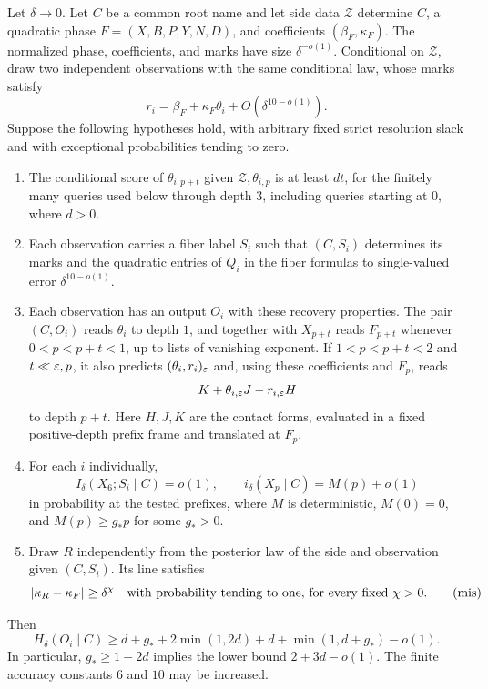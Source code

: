 \begin{lemma}\label{act:line-test}
Let $\delta\to0$.  Let $C$ be a common root name and let side data
$\mathscr Z$ determine $C$, a quadratic phase
$F=(X,B,P,Y,N,D)$, and coefficients $(\beta_F,\kappa_F)$.
The normalized phase, coefficients, and marks have size
$\delta^{-o(1)}$.  Conditional on $\mathscr Z$, draw two independent
observations with the same conditional law, whose marks satisfy
\begin{equation}
 r_i=\beta_F+\kappa_F\theta_i+O(\delta^{10-o(1)}).
 \tag{s-line}\label{eq:s-line}
\end{equation}
Suppose the following hypotheses hold, with arbitrary fixed strict
resolution slack and with exceptional probabilities tending to zero.
\begin{enumerate}[label=\textup{(\roman*)}]
\item The conditional score of $\theta_{i,p+t}$ given
$\mathscr Z,\theta_{i,p}$ is at least $dt$, for the finitely many
queries used below through depth $3$, including queries starting at $0$,
where $d>0$.
\item Each observation carries a fiber label $S_i$ such that $(C,S_i)$
determines its marks and the quadratic entries of $Q_i$ in the fiber
formulas to single-valued error $\delta^{10-o(1)}$.
\item Each observation has an output $O_i$ with these recovery properties.
The pair $(C,O_i)$ reads $\theta_i$ to depth $1$, and together with
$X_{p+t}$ reads $F_{p+t}$ whenever $0<p<p+t<1$, up to lists of
vanishing exponent.  If $1<p<p+t<2$ and $t\ll\varepsilon,p$, it also predicts
$(\theta_i,r_i)_\varepsilon$ and, using these coefficients and $F_p$, reads
\[
 K+\theta_{i,\varepsilon}J-r_{i,\varepsilon}H
\]
to depth $p+t$.  Here $H,J,K$ are the contact forms, evaluated in a
fixed positive-depth prefix frame and translated at $F_p$.
\item For each $i$ individually,
\[
 I_\delta(X_6;S_i\mid C)=o(1),\qquad
 i_\delta(X_p\mid C)=M(p)+o(1)
\]
in probability at the tested prefixes, where $M$ is deterministic,
$M(0)=0$, and $M(p)\ge g_*p$ for some $g_*>0$.
\item Draw $R$ independently from the posterior law of the side and
observation given $(C,S_i)$.  Its line satisfies
\begin{equation}
 \lvert \kappa_R-\kappa_F\rvert\ge\delta^\chi
 \quad\text{with probability tending to one, for every fixed }\chi>0.
 \tag{mis}\label{eq:mis}
\end{equation}
\end{enumerate}
Then
\begin{equation}
 H_\delta(O_i\mid C)
 \ge d+g_*+2\min(1,2d)+d+\min(1,d+g_*)-o(1).
 \tag{line-time}\label{eq:line-time}
\end{equation}
In particular, $g_*\ge1-2d$ implies the lower bound $2+3d-o(1)$.
The finite accuracy constants $6$ and $10$ may be increased.
\end{lemma}

